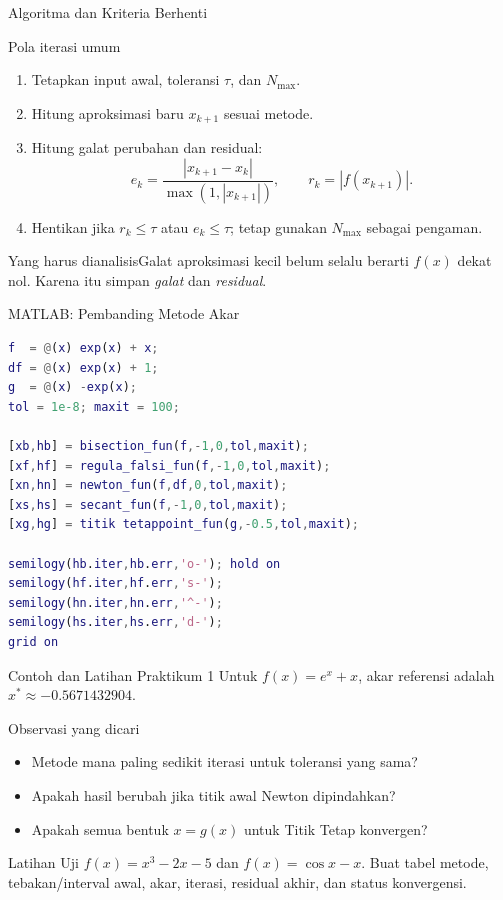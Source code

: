 \documentclass[slides,english,noindex,lean,nobackpage,nocopyright,noupdate,nosummary]{enacom}
\newcommand{\AnalysisBox}[1]{\begin{alertblock}{Yang harus dianalisis}#1\end{alertblock}}
\begin{document}
\begin{frame}{Algoritma dan Kriteria Berhenti}
\begin{block}{Pola iterasi umum}
\begin{enumerate}
\item Tetapkan input awal, toleransi $\tau$, dan $N_{\max}$.
\item Hitung aproksimasi baru $x_{k+1}$ sesuai metode.
\item Hitung galat perubahan dan residual:
\[
e_k=\frac{|x_{k+1}-x_k|}{\max(1,|x_{k+1}|)},\qquad r_k=|f(x_{k+1})|.
\]
\item Hentikan jika $r_k\le\tau$ atau $e_k\le\tau$; tetap gunakan $N_{\max}$ sebagai pengaman.
\end{enumerate}
\end{block}
\AnalysisBox{Galat aproksimasi kecil belum selalu berarti $f(x)$ dekat nol. Karena itu simpan \emph{galat} dan \emph{residual}.}
\end{frame}

\begin{frame}{MATLAB: Pembanding Metode Akar}
\begin{lstlisting}[language=Matlab]
f  = @(x) exp(x) + x;
df = @(x) exp(x) + 1;
g  = @(x) -exp(x);
tol = 1e-8; maxit = 100;

[xb,hb] = bisection_fun(f,-1,0,tol,maxit);
[xf,hf] = regula_falsi_fun(f,-1,0,tol,maxit);
[xn,hn] = newton_fun(f,df,0,tol,maxit);
[xs,hs] = secant_fun(f,-1,0,tol,maxit);
[xg,hg] = titik tetappoint_fun(g,-0.5,tol,maxit);

semilogy(hb.iter,hb.err,'o-'); hold on
semilogy(hf.iter,hf.err,'s-');
semilogy(hn.iter,hn.err,'^-');
semilogy(hs.iter,hs.err,'d-');
grid on
\end{lstlisting}
\end{frame}

\begin{frame}{Contoh dan Latihan Praktikum 1}
Untuk $f(x)=e^x+x$, akar referensi adalah $x^*\approx-0.5671432904$.
\begin{block}{Observasi yang dicari}
\begin{itemize}
\item Metode mana paling sedikit iterasi untuk toleransi yang sama?
\item Apakah hasil berubah jika titik awal Newton dipindahkan?
\item Apakah semua bentuk $x=g(x)$ untuk Titik Tetap konvergen?
\end{itemize}
\end{block}
\begin{exampleblock}{Latihan}
Uji $f(x)=x^3-2x-5$ dan $f(x)=\cos x-x$. Buat tabel metode, tebakan/interval awal, akar, iterasi, residual akhir, dan status konvergensi.
\end{exampleblock}
\end{frame}
\end{document}
